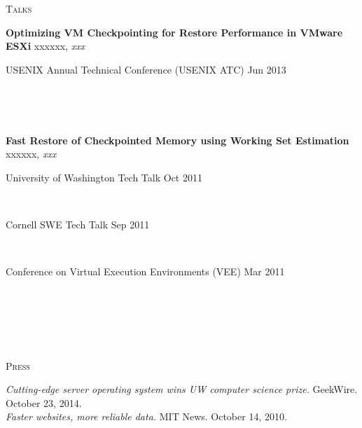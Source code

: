 \documentclass[10pt,times]{report}
\newlength{\sectiongap}
\newlength{\entrygap}
\newlength{\sectioncolwidth}
\newlength{\colgap}
\newlength{\stuffwidth}
\def\ifEqString#1#2{\def\testa{#1}\def\testb{#2}%
  \ifx\testa\testb}
\newenvironment{rtable}{
  \begin{minipage}{\textwidth}
  }{
  \end{minipage}
}
\newenvironment{rentry}[3][xxx]{
  \begin{minipage}[t]{\hsize}
    \textbf{#2}\ifEqString{#1}{xxx}\relax\else, \textit{#1}\fi
    \hspace{\stretch{1}} #3 \\
  }{
    \removelastskip
  \end{minipage}
  \\[\entrygap]  %
}
\newcommand{\rline}[2]{
  \begin{minipage}[t]{\hsize}
    #1 \hspace{\stretch{1}} #2
  \end{minipage} \\
}
\newenvironment{rsection}[1]{
  \begin{minipage}[t]{\sectioncolwidth}
    \textsc{#1}
  \end{minipage}
  \hspace{\colgap}
  \begin{minipage}[t]{\stuffwidth}
  }{
    \removelastskip
  \end{minipage}
  \\[\sectiongap]
}
\begin{document}
\begin{rtable}
\begin{rsection}{Talks}
    \begin{rentry}{Optimizing VM Checkpointing for Restore Performance
      in VMware ESXi}{} 
      \rline{USENIX Annual Technical Conference (USENIX ATC)}{Jun 2013}
    \end{rentry}

    \begin{rentry}{Fast Restore of Checkpointed Memory using Working
        Set Estimation}{}
      \rline{University of Washington Tech Talk}{Oct 2011}
      \rline{Cornell SWE Tech Talk}{Sep 2011}
      \rline{Conference on Virtual Execution Environments (VEE)}{Mar 2011}
    \end{rentry}
  \end{rsection}

  \begin{rsection}{Press}
    \textit{Cutting-edge server operating system wins UW computer
      science prize.} GeekWire. October 23, 2014.\\
    
    \textit{Faster websites, more reliable data.}
    MIT News. October 14, 2010.
  \end{rsection}

\end{rtable}
\end{document}
